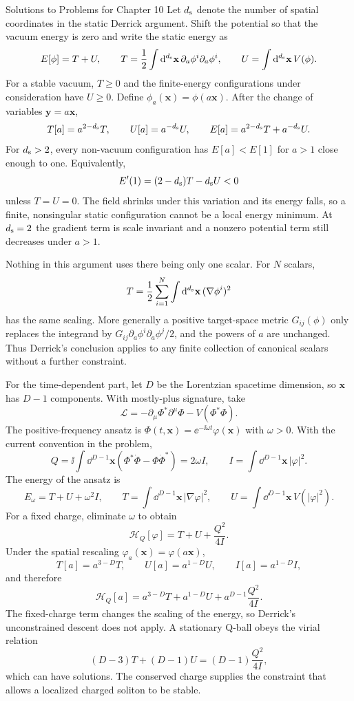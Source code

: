 \begin{bankssolutions}{Solutions to Problems for Chapter 10}
Let $d_{\rm s}$ denote the number of spatial coordinates in the static Derrick
argument.  Shift the potential so that the vacuum energy is zero and write the
static energy as
\[
 E[\phi]=T+U,
 \qquad
 T=\frac12\int\mathop{}\!\mathrm{d}^{d_{\rm s}}\mathbf x\,\partial_a\phi^i\partial_a\phi^i,
 \qquad
 U=\int\mathop{}\!\mathrm{d}^{d_{\rm s}}\mathbf x\,V(\phi).
\]
For a stable vacuum, $T\geq0$ and the finite-energy configurations under
consideration have $U\geq0$.  Define
$\phi_a(\mathbf x)=\phi(a\mathbf x)$.  After the change of variables
$\mathbf y=a\mathbf x$,
\[
 T[a]=a^{2-d_{\rm s}}T,\qquad U[a]=a^{-d_{\rm s}}U,\qquad
 E[a]=a^{2-d_{\rm s}}T+a^{-d_{\rm s}}U.
\]
For $d_{\rm s}>2$, every non-vacuum configuration has $E[a]<E[1]$ for $a>1$ close
enough to one.  Equivalently,
\[
 E'(1)=(2-d_{\rm s})T-d_{\rm s}U<0
\]
unless $T=U=0$.  The field shrinks under this variation and its energy falls,
so a finite, nonsingular static configuration cannot be a local energy minimum.
At $d_{\rm s}=2$ the gradient term is scale invariant and a nonzero potential
term still decreases under $a>1$.

Nothing in this argument uses there being only one scalar.  For $N$ scalars,
\[
 T=\frac12\sum_{i=1}^{N}\int\mathop{}\!\mathrm{d}^{d_{\rm s}}\mathbf x\,(\nabla\phi^i)^2
\]
has the same scaling.  More generally a positive target-space metric
$G_{ij}(\phi)$ only replaces the integrand by
$G_{ij}\partial_a\phi^i\partial_a\phi^j/2$, and the powers of $a$ are
unchanged.  Thus Derrick's conclusion applies to any finite collection of
canonical scalars without a further constraint.

For the time-dependent part, let $D$ be the Lorentzian spacetime dimension, so
$\mathbf x$ has $D-1$ components.  With mostly-plus signature, take
\[
 \mathcal L=-\partial_\mu\Phi^*\partial^\mu\Phi-V(\Phi^*\Phi).
\]
The positive-frequency ansatz is
$\Phi(t,\mathbf x)=\ee^{-\ii\omega t}\varphi(\mathbf x)$ with $\omega>0$.  With
the current convention in the problem,
\[
 Q=\ii\int\dd^{D-1}\mathbf x\left(\Phi^*\dot\Phi-
 \Phi\dot\Phi^*\right)=2\omega I,
 \qquad I=\int\dd^{D-1}\mathbf x\,|\varphi|^2.
\]
The energy of the ansatz is
\[
 E_\omega=T+U+\omega^2I,
 \qquad
 T=\int\dd^{D-1}\mathbf x\,|\nabla\varphi|^2,
 \qquad
 U=\int\dd^{D-1}\mathbf x\,V(|\varphi|^2).
\]
For a fixed charge, eliminate $\omega$ to obtain
\[
 \mathcal H_Q[\varphi]=T+U+\frac{Q^2}{4I}.
\]
Under the spatial rescaling $\varphi_a(\mathbf x)=\varphi(a\mathbf x)$,
\[
 T[a]=a^{3-D}T,\qquad U[a]=a^{1-D}U,\qquad I[a]=a^{1-D}I,
\]
and therefore
\[
 \mathcal H_Q[a]=a^{3-D}T+a^{1-D}U+a^{D-1}\frac{Q^2}{4I}.
\]
The fixed-charge term changes the scaling of the energy, so Derrick's
unconstrained descent does not apply.  A stationary Q-ball obeys the virial
relation
\[
 (D-3)T+(D-1)U=(D-1)\frac{Q^2}{4I},
\]
which can have solutions.  The conserved charge supplies the constraint that
allows a localized charged soliton to be stable.


\end{bankssolutions}
